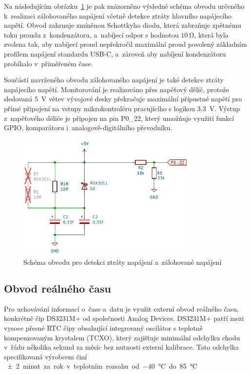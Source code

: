 Na následujícím obrázku~\ref{fig:backup-power} je pak znázorněno výsledné schéma obvodu určeného k~realizaci zálohovaného napájení včetně detekce ztráty hlavního napájecího napětí. Obvod zahrnuje zmíněnou Schottkyho diodu, která zabraňuje zpětnému toku proudu z~kondenzátoru, a~nabíjecí odpor s hodnotou $\SI{10}{\ohm}$, která byla zvolena tak, aby nabíjecí proud nepřekročil maximální proud povolený základním profilem napájení standardu USB-C, a~zároveň aby nabíjení kondenzátoru probíhalo v~přiměřeném čase.

\newpage

Součástí navrženého obvodu zálohovaného napájení je také detekce ztráty napájecího napětí. Monitorování je realizováno přes napěťový dělič, protože sledovaná \SI{5}{\volt} větev vývojové desky překračuje maximální přípustné napětí pro přímé připojení na vstupy mikrokontroléru pracujícího s logikou \SI{3.3}{\volt}. Výstup z~napěťového děliče je připojen na pin P0\_22, který umožňuje využití funkcí GPIO, komparátoru i~analogově-digitálního převodníku.

\begin{figure}[h]
    \centering
    \includegraphics[width=0.80\textwidth]{obrazky-figures/backup-power.pdf}
    
    \caption{Schéma obvodu pro detekci ztráty napájení a~zálohované napájení}
    \label{fig:backup-power}
\end{figure}

\newpage

\subsection{Obvod reálného času}
Pro uchovávání informací o~čase a~datu je využit externí obvod reálného času, konkrétně čip DS3231M+ od společnosti Analog Devices. DS3231M+ patří mezi vysoce přesné RTC čipy obsahující integrovaný oscilátor s teplotně kompenzovaným krystalem (TCXO), který zajišťuje minimální odchylku chodu v~řádu několika sekund za měsíc bez nutnosti externí kalibrace. Tato odchylka specifikovaná výrobcem činí \SI{\pm2} minut za rok v~teplotním rozsahu od \SI{-40}{\degreeCelsius} do \SI{+85}{\degreeCelsius}.~\cite{DS3231_manual}

